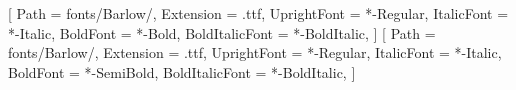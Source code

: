 %
%
%
%

\usepackage{iftex}
\ifLuaTeX
	\usepackage{fontspec}
	\setmainfont{Barlow}[
		Path           = fonts/Barlow/,
		Extension      = .ttf,
		UprightFont    = *-Regular,
		ItalicFont     = *-Italic,
		BoldFont       = *-Bold,
		BoldItalicFont = *-BoldItalic,
	]
	\setsansfont{Barlow}[
		Path           = fonts/Barlow/,
		Extension      = .ttf,
		UprightFont    = *-Regular,
		ItalicFont     = *-Italic,
		BoldFont       = *-SemiBold,
		BoldItalicFont = *-BoldItalic,
	]
	\usepackage{microtype}

\fi
